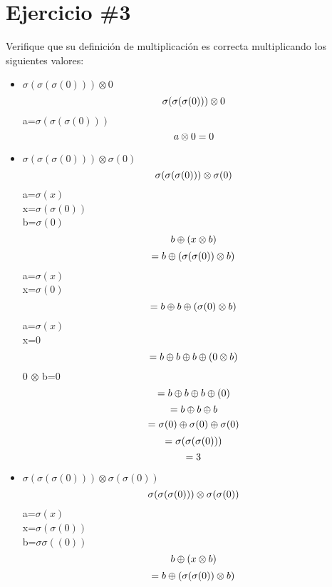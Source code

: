 \documentclass{article}
\begin{document}
\section*{Ejercicio \#3}
Verifique que su definici\'on de multiplicaci\'on es correcta multiplicando los siguientes valores:
\begin{itemize}
        \item{$\sigma(\sigma(\sigma(0)))\otimes 0$}\\
\[
       \sigma(\sigma(\sigma(0)))\otimes 0\\
\] 
        a=$\sigma(\sigma(\sigma(0)))$\\
\[
       a\otimes 0=0\\
\] 
        
        \item{$\sigma(\sigma(\sigma(0)))\otimes \sigma(0)$}
\[
       \sigma(\sigma(\sigma(0)))\otimes \sigma(0)\\
\] 
        a=$\sigma(x)$\\
        x=$\sigma(\sigma(0))$\\
        b=$\sigma(0)$
\[
       b\oplus(x\otimes b)\\
\]
\[
       =b\oplus(\sigma(\sigma(0))\otimes b)\\
\]
        a=$\sigma(x)$\\
        x=$\sigma(0)$
\[
       =b\oplus b\oplus(\sigma(0)\otimes b)\\
\]
        a=$\sigma(x)$\\
        x=0
\[
       =b\oplus b\oplus b\oplus(0\otimes b)\\
\]
 0 $\otimes$ b=0
\[
       =b\oplus b\oplus b\oplus(0)\\
\]
\[
       =b\oplus b\oplus b\\
\]
\[
       =\sigma(0)\oplus \sigma(0)\oplus \sigma(0)\\
\]
\[
       =\sigma( \sigma( \sigma(0)))\\
\]
\[
       =3\\
\]
        \item{$\sigma(\sigma(\sigma(0)))\otimes \sigma(\sigma(0))$}
        \[
       \sigma(\sigma(\sigma(0)))\otimes \sigma(\sigma(0))\\
\] 
        a=$\sigma(x)$\\
        x=$\sigma(\sigma(0))$\\
        b=$\sigma\sigma((0))$
\[
       b\oplus(x\otimes b)\\
\]
\[
       =b\oplus(\sigma(\sigma(0))\otimes b)\\
\]
\end{itemize}
\end{document}
